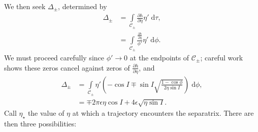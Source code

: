\documentclass[
        fleqn,
        usenatbib,
    ]{mnras}
\newcommand*{\pd}[2]{\frac{\partial#1}{\partial#2}}
\newcommand*{\p}[1]{\left(#1\right)}
\begin{document}
We then seek $\Delta_{\pm}$, determined by
\begin{align}
    \Delta_{\pm} &= \int\limits_{\mathcal{C}_{\pm}}
            \pd{h}{\eta}\eta'\;\mathrm{d}\tau,\nonumber\\
        &= \int\limits_{\mathcal{C}_{\pm}}
            \frac{\pd{h}{\eta}}{\phi'}\eta'\;\mathrm{d}\phi.
\end{align}
We must proceed carefully since $\phi' \to 0$ at the endpoints of
$\mathcal{C}_{\pm}$; careful work shows these zeros cancel against zeros of
$\pd{h}{\eta}$, and
\begin{align}
    \Delta_{\pm} &= \int\limits_{\mathcal{C}_{\pm}} \eta'
        \p{-\cos I \mp \sin I \sqrt{\frac{1 - \cos \phi}{2\eta\sin I}}}
            \;\mathrm{d}\phi,\label{eq:p1_delta_eq}\\
        &= \mp 2\pi \epsilon \eta \cos I
            + 4\epsilon\sqrt{\eta \sin I}.\label{eq:p1_delta}
\end{align}
Call $\eta_\star$ the value of $\eta$ at which a trajectory encounters the
separatrix. There are then three possibilities:
\end{document}
